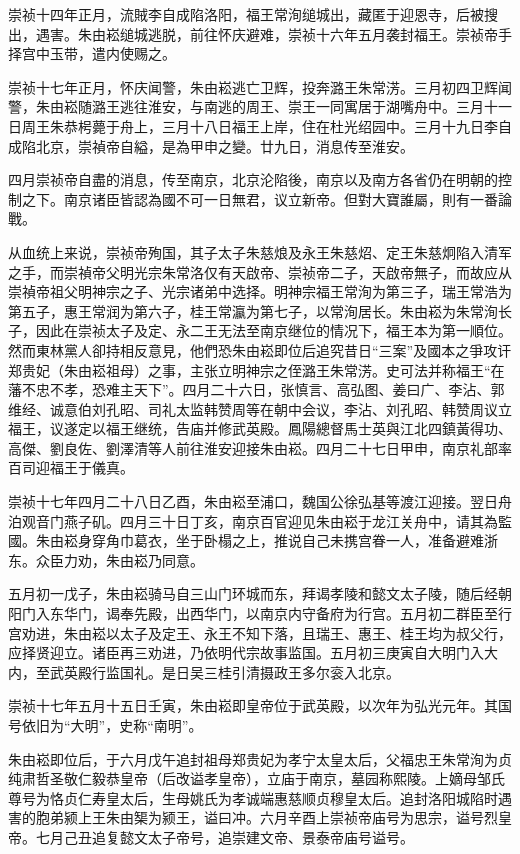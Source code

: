崇祯十四年正月，流賊李自成陷洛阳，福王常洵缒城出，藏匿于迎恩寺，后被搜出，遇害。朱由崧缒城逃脱，前往怀庆避难，崇祯十六年五月袭封福王。崇祯帝手择宫中玉带，遣内使赐之。

崇祯十七年正月，怀庆闻警，朱由崧逃亡卫辉，投奔潞王朱常淓。三月初四卫辉闻警，朱由崧随潞王逃往淮安，与南逃的周王、崇王一同寓居于湖嘴舟中。三月十一日周王朱恭枵薨于舟上，三月十八日福王上岸，住在杜光绍园中。三月十九日李自成陷北京，崇禎帝自縊，是為甲申之變。廿九日，消息传至淮安。

四月崇祯帝自盡的消息，传至南京，北京沦陷後，南京以及南方各省仍在明朝的控制之下。南京诸臣皆認為國不可一日無君，议立新帝。但對大寶誰屬，則有一番論戰。

从血统上来说，崇祯帝殉国，其子太子朱慈烺及永王朱慈炤、定王朱慈炯陷入清军之手，而崇禎帝父明光宗朱常洛仅有天啟帝、崇祯帝二子，天啟帝無子，而故应从崇禎帝祖父明神宗之子、光宗诸弟中选择。明神宗福王常洵为第三子，瑞王常浩为第五子，惠王常润为第六子，桂王常瀛为第七子，以常洵居长。朱由崧为朱常洵长子，因此在崇祯太子及定、永二王无法至南京继位的情况下，福王本为第一順位。然而東林黨人卻持相反意見，他們恐朱由崧即位后追究昔日“三案”及國本之爭攻讦郑贵妃（朱由崧祖母）之事，主张立明神宗之侄潞王朱常淓。史可法并称福王“在藩不忠不孝，恐难主天下”。四月二十六日，张慎言、高弘图、姜曰广、李沾、郭维经、诚意伯刘孔昭、司礼太监韩赞周等在朝中会议，李沾、刘孔昭、韩赞周议立福王，议遂定以福王继统，告庙并修武英殿。鳳陽總督馬士英與江北四鎮黃得功、高傑、劉良佐、劉澤清等人前往淮安迎接朱由崧。四月二十七日甲申，南京礼部率百司迎福王于儀真。

崇祯十七年四月二十八日乙酉，朱由崧至浦口，魏国公徐弘基等渡江迎接。翌日舟泊观音门燕子矶。四月三十日丁亥，南京百官迎见朱由崧于龙江关舟中，请其為監國。朱由崧身穿角巾葛衣，坐于卧榻之上，推说自己未携宫眷一人，准备避难浙东。众臣力劝，朱由崧乃同意。

五月初一戊子，朱由崧骑马自三山门环城而东，拜谒孝陵和懿文太子陵，随后经朝阳门入东华门，谒奉先殿，出西华门，以南京内守备府为行宫。五月初二群臣至行宫劝进，朱由崧以太子及定王、永王不知下落，且瑞王、惠王、桂王均为叔父行，应择贤迎立。诸臣再三劝进，乃依明代宗故事监国。五月初三庚寅自大明门入大内，至武英殿行监国礼。是日吴三桂引清摄政王多尔衮入北京。

崇祯十七年五月十五日壬寅，朱由崧即皇帝位于武英殿，以次年为弘光元年。其国号依旧为“大明”，史称“南明”。

朱由崧即位后，于六月戊午追封祖母郑贵妃为孝宁太皇太后，父福忠王朱常洵为贞纯肃哲圣敬仁毅恭皇帝（后改谥孝皇帝），立庙于南京，墓园称熙陵。上嫡母邹氏尊号为恪贞仁寿皇太后，生母姚氏为孝诚端惠慈顺贞穆皇太后。追封洛阳城陷时遇害的胞弟颍上王朱由榘为颍王，谥曰冲。六月辛酉上崇祯帝庙号为思宗，谥号烈皇帝。七月己丑追复懿文太子帝号，追崇建文帝、景泰帝庙号谥号。

